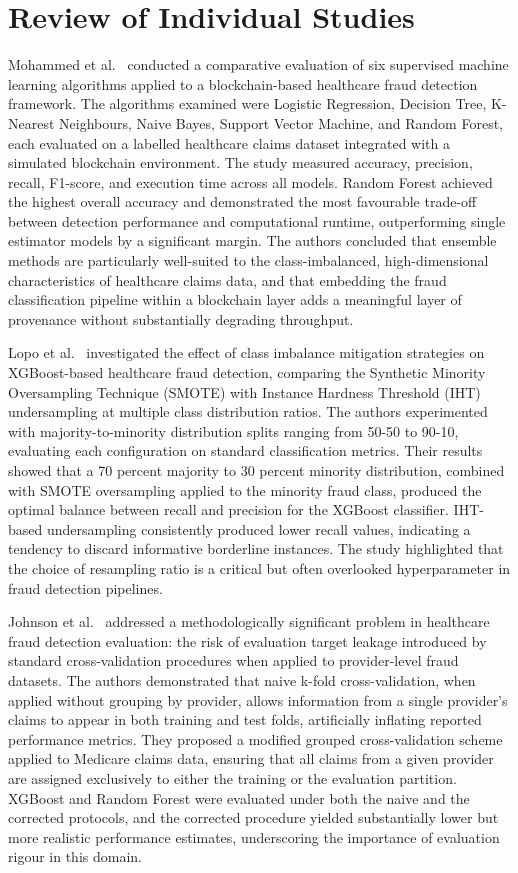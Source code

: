 \section{Review of Individual Studies}

Mohammed et al.\ \cite{mohammed2023} conducted a comparative evaluation of six supervised machine learning algorithms applied to a blockchain-based healthcare fraud detection framework. The algorithms examined were Logistic Regression, Decision Tree, K-Nearest Neighbours, Naive Bayes, Support Vector Machine, and Random Forest, each evaluated on a labelled healthcare claims dataset integrated with a simulated blockchain environment. The study measured accuracy, precision, recall, F1-score, and execution time across all models. Random Forest achieved the highest overall accuracy and demonstrated the most favourable trade-off between detection performance and computational runtime, outperforming single estimator models by a significant margin. The authors concluded that ensemble methods are particularly well-suited to the class-imbalanced, high-dimensional characteristics of healthcare claims data, and that embedding the fraud classification pipeline within a blockchain layer adds a meaningful layer of provenance without substantially degrading throughput.

Lopo et al.\ \cite{lopo2023} investigated the effect of class imbalance mitigation strategies on XGBoost-based healthcare fraud detection, comparing the Synthetic Minority Oversampling Technique (SMOTE) with Instance Hardness Threshold (IHT) undersampling at multiple class distribution ratios. The authors experimented with majority-to-minority distribution splits ranging from 50-50 to 90-10, evaluating each configuration on standard classification metrics. Their results showed that a 70 percent majority to 30 percent minority distribution, combined with SMOTE oversampling applied to the minority fraud class, produced the optimal balance between recall and precision for the XGBoost classifier. IHT-based undersampling consistently produced lower recall values, indicating a tendency to discard informative borderline instances. The study highlighted that the choice of resampling ratio is a critical but often overlooked hyperparameter in fraud detection pipelines.

Johnson et al.\ \cite{johnson2023} addressed a methodologically significant problem in healthcare fraud detection evaluation: the risk of evaluation target leakage introduced by standard cross-validation procedures when applied to provider-level fraud datasets. The authors demonstrated that naive k-fold cross-validation, when applied without grouping by provider, allows information from a single provider's claims to appear in both training and test folds, artificially inflating reported performance metrics. They proposed a modified grouped cross-validation scheme applied to Medicare claims data, ensuring that all claims from a given provider are assigned exclusively to either the training or the evaluation partition. XGBoost and Random Forest were evaluated under both the naive and the corrected protocols, and the corrected procedure yielded substantially lower but more realistic performance estimates, underscoring the importance of evaluation rigour in this domain.

